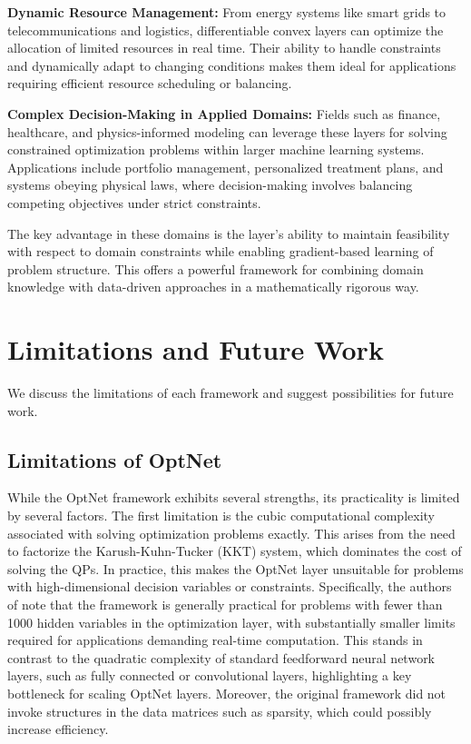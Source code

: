 \documentclass{article}
\begin{document}
\textbf{Dynamic Resource Management:}
From energy systems like smart grids to telecommunications and logistics, differentiable convex layers can optimize the allocation of limited resources in real time. Their ability to handle constraints and dynamically adapt to changing conditions makes them ideal for applications requiring efficient resource scheduling or balancing.

\textbf{Complex Decision-Making in Applied Domains:}
Fields such as finance, healthcare, and physics-informed modeling can leverage these layers for solving constrained optimization problems within larger machine learning systems. Applications include portfolio management, personalized treatment plans, and systems obeying physical laws, where decision-making involves balancing competing objectives under strict constraints.

The key advantage in these domains is the layer's ability to maintain feasibility with respect to domain constraints while enabling gradient-based learning of problem structure. This offers a powerful framework for combining domain knowledge with data-driven approaches in a mathematically rigorous way.



\section{Limitations and Future Work}

We discuss the limitations of each framework and suggest possibilities for future work. 

\subsection{Limitations of OptNet}

While the OptNet framework exhibits several strengths, its practicality is limited by several factors. The first limitation is the cubic computational complexity associated with solving optimization problems exactly. This arises from the need to factorize the Karush-Kuhn-Tucker (KKT) system, which dominates the cost of solving the QPs. In practice, this makes the OptNet layer unsuitable for problems with high-dimensional decision variables or constraints. Specifically, the authors of \citet{optnet} note that the framework is generally practical for problems with fewer than 1000 hidden variables in the optimization layer, with substantially smaller limits required for applications demanding real-time computation. This stands in contrast to the quadratic complexity of standard feedforward neural network layers, such as fully connected or convolutional layers, highlighting a key bottleneck for scaling OptNet layers. Moreover, the original framework did not invoke structures in the data matrices such as sparsity, which could possibly increase efficiency. 
\end{document}
